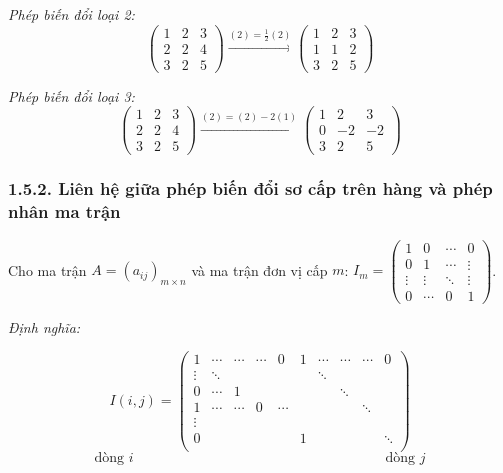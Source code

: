\textit{Phép biến đổi loại 2:}
\[
\begin{pmatrix}
1 & 2 & 3 \\
2 & 2 & 4 \\
3 & 2 & 5
\end{pmatrix}
\xrightarrow{(2) = \frac{1}{2}(2)}
\begin{pmatrix}
1 & 2 & 3 \\
1 & 1 & 2 \\
3 & 2 & 5
\end{pmatrix}
\]

\textit{Phép biến đổi loại 3:}
\[
\begin{pmatrix}
1 & 2 & 3 \\
2 & 2 & 4 \\
3 & 2 & 5
\end{pmatrix}
\xrightarrow{(2) = (2) - 2(1)}
\begin{pmatrix}
1 & 2 & 3 \\
0 & -2 & -2 \\
3 & 2 & 5
\end{pmatrix}
\]
\subsubsection*{1.5.2. Liên hệ giữa phép biến đổi sơ cấp trên hàng và phép nhân ma trận}
Cho ma trận \( A = (a_{ij})_{m \times n} \) và ma trận đơn vị cấp \( m \): \( I_m = \begin{pmatrix}
1 & 0 & \cdots & 0 \\
0 & 1 & \cdots & \vdots \\
\vdots & \vdots & \ddots & \vdots \\
0 & \cdots & 0 & 1
\end{pmatrix} \).

\textit{Định nghĩa:}

\[
I(i, j) = \begin{pmatrix}
1 & \cdots & \cdots & \cdots & 0 & 1 & \cdots & \cdots & \cdots & 0 \\
\vdots & \ddots & & & & & \ddots & & & \\
0 & \cdots & 1 & & & & & \ddots & & \\
1 & \cdots & \cdots & 0 & \cdots & & & & \ddots & \\
\vdots & & & & & & & & & \\
0 & & & & & 1 & & & & \ddots \\
\end{pmatrix} 
\]
\[
\text{dòng } i \quad \quad \quad \quad \quad \quad \quad \quad \quad \quad \quad \quad \quad \quad \quad \quad \quad \quad \text{dòng } j
\]

